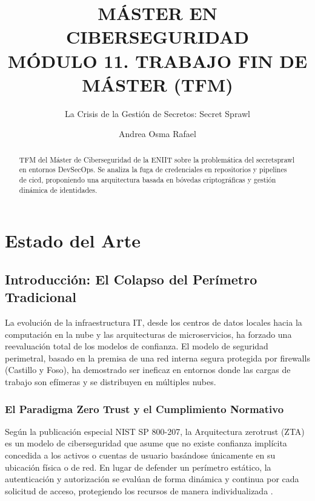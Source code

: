 \documentclass[runningheads]{llncs}
\begin{document}
\title{\texorpdfstring{MÁSTER EN CIBERSEGURIDAD \\ \vspace{0.5cm} \large MÓDULO 11. TRABAJO FIN DE MÁSTER (TFM)}{MÁSTER EN CIBERSEGURIDAD - MÓDULO 11. TRABAJO FIN DE MÁSTER (TFM)}}
\subtitle{La Crisis de la Gestión de Secretos: Secret Sprawl}

\author{Andrea Osma Rafael}


\maketitle

\begin{abstract}
TFM del Máster de Ciberseguridad de la ENIIT sobre la problemática del \gls{secretsprawl} en entornos DevSecOps. Se analiza la fuga de credenciales en repositorios y pipelines de \gls{cicd}, proponiendo una arquitectura basada en bóvedas criptográficas y gestión dinámica de identidades.
\end{abstract}

\newpage

\tableofcontents
\newpage

\section{Estado del Arte}
\subsection{Introducción: El Colapso del Perímetro Tradicional}

La evolución de la infraestructura IT, desde los centros de datos locales hacia la computación en la nube y las arquitecturas de microservicios, ha forzado una reevaluación total de los modelos de confianza. El modelo de seguridad perimetral, basado en la premisa de una red interna segura protegida por firewalls (Castillo y Foso), ha demostrado ser ineficaz en entornos donde las cargas de trabajo son efímeras y se distribuyen en múltiples nubes.

\subsubsection{El Paradigma Zero Trust y el Cumplimiento Normativo}
Según la publicación especial NIST SP 800-207, la Arquitectura \gls{zerotrust} (ZTA) es un modelo de ciberseguridad que asume que no existe confianza implícita concedida a los activos o cuentas de usuario basándose únicamente en su ubicación física o de red. En lugar de defender un perímetro estático, la autenticación y autorización se evalúan de forma dinámica y continua por cada solicitud de acceso, protegiendo los recursos de manera individualizada \parencite{nist_sp800_207}.
\end{document}
